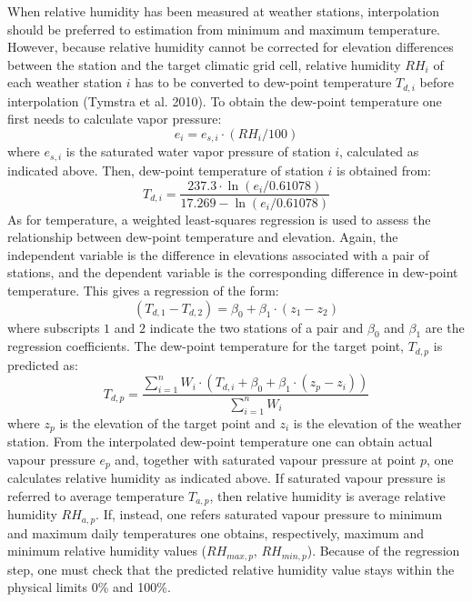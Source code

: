 \documentclass[11pt,a4paper]{article}
\begin{document}
When relative humidity has been measured at weather stations, interpolation should be preferred to estimation from minimum and maximum temperature. However, because relative humidity cannot be corrected for elevation differences between the station and the target climatic grid cell, relative humidity $RH_i$ of each weather station $i$ has to be converted to dew-point temperature $T_{d,i}$ before interpolation (Tymstra et al. 2010). To obtain the dew-point temperature one first needs to calculate vapor pressure:
\begin{equation}
e_i = e_{s,i} \cdot (RH_i / 100)
\end{equation}
where $e_{s,i}$ is the saturated water vapor pressure of station $i$, calculated as indicated above. Then, dew-point temperature of station $i$ is obtained from:
\begin{equation}
T_{d,i} = \frac{237.3\cdot \ln(e_i/0.61078)}{17.269 - \ln(e_i/0.61078)}
\end{equation}
As for temperature, a weighted least-squares regression is used to assess the relationship between dew-point temperature and elevation. Again, the independent variable is the difference in elevations associated with a pair of stations, and the dependent variable is the corresponding difference in dew-point temperature. This gives a regression of the form:
\begin{equation}
(T_{d,1} - T_{d,2}) = \beta_0 + \beta_1 \cdot (z_1 - z_2)
\end{equation}
where subscripts $1$ and $2$ indicate the two stations of a pair and $\beta_0$ and $\beta_1$ are the regression coefficients. The dew-point temperature for the target point, $T_{d,p}$ is predicted as:
\begin{equation}
T_{d,p} = \frac{\sum_{i=1}^{n}{W_i\cdot (T_{d,i} + \beta_0 + \beta_1 \cdot(z_p - z_i))}}{\sum_{i=1}^{n}{W_i}}
\end{equation}
where $z_p$ is the elevation of the target point and $z_i$ is the elevation of the weather station. From the interpolated dew-point temperature one can obtain actual vapour pressure $e_{p}$ and, together with saturated vapour pressure at point $p$, one calculates relative humidity as indicated above. If saturated vapour pressure is referred to average temperature $T_{a,p}$, then relative humidity is average relative humidity $RH_{a,p}$. If, instead, one refers saturated vapour pressure to minimum and maximum daily temperatures one obtains, respectively, maximum and minimum relative humidity values ($RH_{max,p}$, $RH_{min,p}$). Because of the regression step, one must check that the predicted relative humidity value stays within the physical limits 0\% and 100\%.
\end{document}
